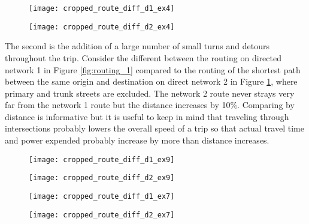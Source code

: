 \begin{figure}
\centering
\begin{minipage}{.5\textwidth}
  \centering
  \texttt{[image: cropped\_route\_diff\_d1\_ex4]}
  \label{fig:routing_1}
\end{minipage}%
\begin{minipage}{.5\textwidth}
  \centering
  \texttt{[image: cropped\_route\_diff\_d2\_ex4]}
  \label{fig:routing_2}
\end{minipage}
\end{figure}

The second is the addition of a large number of small turns and detours throughout the trip. Consider the different between the routing on directed network 1 in Figure \ref{fig:routing_1} compared to the routing of the shortest path between the same origin and destination on direct network 2 in Figure \ref{fig:routing_2}, where primary and trunk streets are excluded. The network 2 route never strays very far from the network 1 route but the distance increases by 10\%. Comparing by distance is informative but it is useful to keep in mind that traveling through intersections probably lowers the overall speed of a trip so that actual travel time and power expended probably increase by more than distance increases. 

\begin{figure}
\centering
\begin{minipage}{.5\textwidth}
  \centering
  \texttt{[image: cropped\_route\_diff\_d1\_ex9]}
  \label{fig:routing_3}
\end{minipage}%
\begin{minipage}{.5\textwidth}
  \centering
  \texttt{[image: cropped\_route\_diff\_d2\_ex9]}
  \label{fig:routing_4}
\end{minipage}
\end{figure}

\begin{figure}
\centering
\begin{minipage}{.5\textwidth}
  \centering
  \texttt{[image: cropped\_route\_diff\_d1\_ex7]}
  \label{fig:routing_5}
\end{minipage}%
\begin{minipage}{.5\textwidth}
  \centering
  \texttt{[image: cropped\_route\_diff\_d2\_ex7]}
  \label{fig:routing_6}
\end{minipage}
\end{figure}

